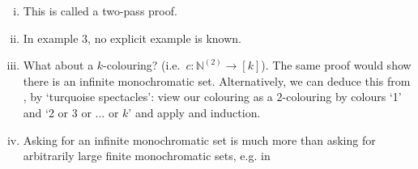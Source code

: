 \documentclass{article}
\begin{document}
\begin{remark}\leavevmode
  \begin{enumerate}[(i)]
    \item This is called a two-pass proof.
    \item In example 3, no explicit example is known.
    \item What about a $k$-colouring? (i.e.\ $c: \mathbb{N}^{(2)} \to [k]$). The same proof would show there is an infinite monochromatic set.
      Alternatively, we can deduce this from , by `turquoise spectacles': view our colouring as a $2$-colouring by colours `1' and `2 or 3 or ... or $k$' and apply  and induction.
    \item Asking for an infinite monochromatic set is much more than asking for arbitrarily large finite monochromatic sets, e.g. in

\end{enumerate}
\end{remark}
\end{document}
